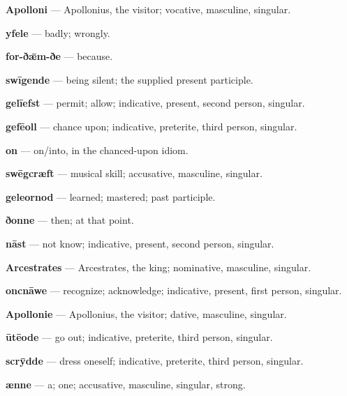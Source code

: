 \textbf{Apolloni} — Apollonius, the visitor; vocative, masculine, singular.

\textbf{yfele} — badly; wrongly.

\textbf{for-ðǣm-ðe} — because.

\textbf{swīgende} — being silent; the supplied present participle.

\textbf{gelīefst} — permit; allow; indicative, present, second person, singular.

\textbf{gefēoll} — chance upon; indicative, preterite, third person, singular.

\textbf{on} — on/\allowbreak{}into, in the chanced-upon idiom.

\textbf{swēgcræft} — musical skill; accusative, masculine, singular.

\textbf{geleornod} — learned; mastered; past participle.

\textbf{ðonne} — then; at that point.

\textbf{nāst} — not know; indicative, present, second person, singular.

\textbf{Arcestrates} — Arcestrates, the king; nominative, masculine, singular.

\textbf{oncnāwe} — recognize; acknowledge; indicative, present, first person, singular.

\textbf{Apollonie} — Apollonius, the visitor; dative, masculine, singular.

\textbf{ūtēode} — go out; indicative, preterite, third person, singular.

\textbf{scrȳdde} — dress oneself; indicative, preterite, third person, singular.

\textbf{ænne} — a; one; accusative, masculine, singular, strong.

